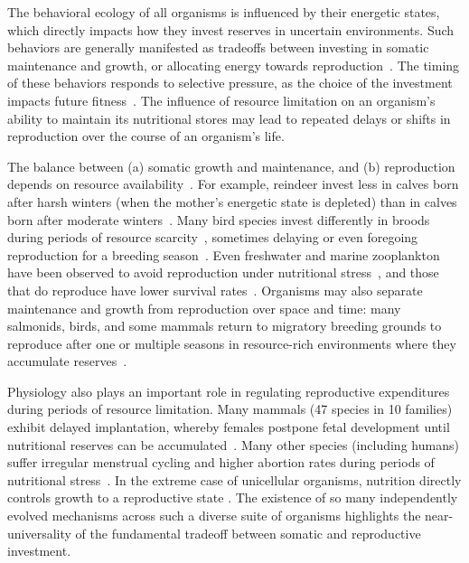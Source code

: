 \documentclass[twocolumn,preprintnumbers,amsmath,amssymb,superscriptaddress]{revtex4}
\begin{document}
\begin{bibunit}[unsrt]

  The behavioral ecology of all organisms is influenced by their energetic
  states, which directly impacts how they invest reserves in uncertain
  environments.  Such behaviors are generally manifested as tradeoffs between
  investing in somatic maintenance and growth, or allocating energy towards
  reproduction~\citep{Martin:1987dl,Kirk:1997cc,Kempes:2012hy}.  The timing of
  these behaviors responds to selective pressure, as the choice of the
  investment impacts future
  fitness~\citep{Mangel:1988uaa,Mangel:2014kz,Yeakel:2013hi}.  The influence of
  resource limitation on an organism's ability to maintain its nutritional
  stores may lead to repeated delays or shifts in reproduction over the course
  of an organism's life.

  The balance between (a) somatic growth and maintenance, and (b) reproduction depends on resource availability~\citep{Morris:1987eo}.
  For example, reindeer invest less in calves born after harsh winters (when the mother's energetic state is depleted) than in calves born after moderate winters~\citep{Tveraa:2003fq}.
  Many bird species invest differently in broods during periods of resource scarcity~\citep{Daan:1988va,Jacot:2009dv}, sometimes delaying or even foregoing reproduction for a breeding season~\citep{Martin:1987dl,Stearns:1989ip,Barboza:2002in}.
  Even freshwater and marine zooplankton have been observed to avoid reproduction under nutritional stress~\citep{Threlkeld:1976ih}, and those that do reproduce have lower survival rates~\citep{Kirk:1997cc}.
  Organisms may also separate maintenance and growth from reproduction over space and time: many salmonids, birds, and some mammals return to migratory breeding grounds to reproduce after one or multiple seasons in resource-rich environments where they accumulate reserves~\citep{Weber:1998jg,Mduma:1999cp,Moore:2014hi}.

  Physiology also plays an important role in regulating reproductive expenditures during periods of resource limitation.
  Many mammals (47 species in 10 families) exhibit delayed implantation, whereby females postpone fetal development until nutritional reserves can be accumulated~\citep{Mead:1989dt,Sandell:1990kw}.
  Many other species (including humans) suffer irregular menstrual cycling and higher abortion rates during periods of nutritional stress~\citep{Bulik:1999eo,Trites:2003cc}.
  In the extreme case of unicellular organisms, nutrition directly controls growth to a reproductive state \citep{Glazier:2009hq,Kempes:2012hy}. The existence of so many independently evolved mechanisms across such a diverse suite of organisms highlights the near-universality of the fundamental tradeoff between somatic and reproductive investment.


\end{bibunit}
\end{document}
